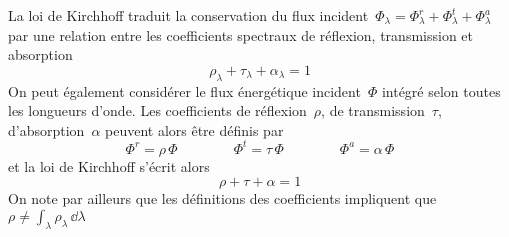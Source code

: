 \sk
La loi de Kirchhoff traduit la conservation du flux incident~$\Phi_{\lambda} = \Phi_{\lambda}^r + \Phi_{\lambda}^t + \Phi_{\lambda}^a$ par une relation entre les coefficients spectraux de réflexion, transmission et absorption $$ \boxed{ \rho_{\lambda} + \tau_{\lambda} + \alpha_{\lambda} = 1 } $$ On peut également considérer le flux énergétique incident~$\Phi$ intégré selon toutes les longueurs d'onde. Les coefficients de réflexion~$\rho$, de transmission~$\tau$, d'absorption~$\alpha$ peuvent alors être définis par $$\Phi^r = \rho \, \Phi \qquad\qquad \Phi^t = \tau \, \Phi \qquad\qquad \Phi^a = \alpha \, \Phi $$ et la loi de Kirchhoff s'écrit alors $$ \boxed{ \rho + \tau + \alpha = 1 } $$ On note par ailleurs que les définitions des coefficients impliquent que $\rho \ne \int_{\lambda} \rho_\lambda \, \dd\lambda$
